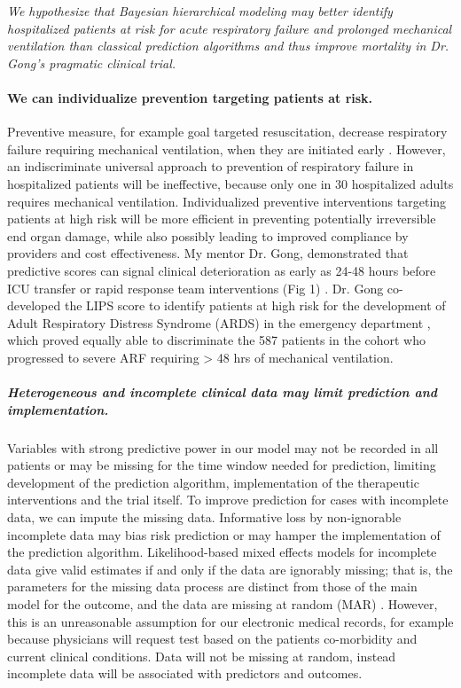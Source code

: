 \documentclass[11pt,notitlepage]{article}
\begin{document}
\emph{We hypothesize that Bayesian hierarchical modeling may better identify hospitalized patients at risk for acute respiratory failure and prolonged mechanical ventilation than classical prediction algorithms and thus improve mortality in Dr. Gong's pragmatic clinical trial.}

\paragraph*{We can individualize prevention targeting patients at risk.}

Preventive measure, for example goal targeted resuscitation, decrease respiratory failure requiring mechanical ventilation, when they are initiated early \cite{Rivers_12594312}. However, an indiscriminate universal approach to prevention of respiratory failure in hospitalized patients will be ineffective, because only one in 30 hospitalized adults requires mechanical ventilation. Individualized preventive interventions targeting patients at high risk will be more efficient in preventing potentially irreversible end organ damage, while also possibly leading to improved compliance by providers and cost effectiveness. My mentor Dr. Gong, demonstrated that predictive scores can signal clinical deterioration as early as 24-48 hours before ICU transfer or rapid response team interventions (Fig 1) \cite{Yu_24970344}. Dr. Gong co-developed the LIPS score to identify patients at high risk for the development of Adult Respiratory Distress Syndrome (ARDS) in the emergency department \cite{Herridge_12594312}, which proved equally able to discriminate the 587 patients in the cohort who progressed to severe ARF requiring > 48 hrs of mechanical ventilation. 

\subparagraph*{Heterogeneous and incomplete clinical data may limit prediction and implementation.}
Variables with strong predictive power in our model may not be recorded in all patients or may be missing for the time window needed for prediction, limiting development of the prediction algorithm, implementation of the therapeutic interventions and the trial itself. To improve prediction for cases with incomplete data, we can impute the missing data. Informative loss by non-ignorable incomplete data may bias risk prediction or may hamper the implementation of the prediction algorithm. Likelihood-based mixed effects models for incomplete data give valid estimates if and only if the data are ignorably missing; that is, the parameters for the missing data process are distinct from those of the main model for the outcome, and the data are missing at random (MAR) \cite{Rubin_1976}. However, this is an unreasonable assumption for our electronic medical records, for example because physicians will request test based on the patients co-morbidity and current clinical conditions. Data will not be missing at random, instead incomplete data will be associated with predictors and outcomes.
\end{document}
